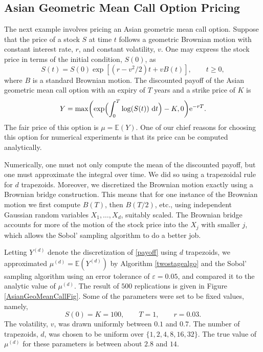 \documentclass[graybox]{svmult}
\newcommand{\me}{\ensuremath{\mathrm{e}}} %
\newcommand\e{\mathbb{E}}
\newcommand{\rd}{\,\mathrm{d}}
\newcommand{\dif}{\rd}
\begin{document}
\subsection{Asian Geometric Mean Call Option Pricing}

The next example involves pricing an Asian geometric mean call option.  Suppose that the price of a stock $S$ at time $t$ follows a geometric Brownian motion with constant interest rate, $r$, and constant volatility, $v$.  One may express the stock price in terms of the initial condition, $S(0)$, as 
\[
S(t)=S(0) \exp[(r-v^2/2)t + v B(t)], \qquad t \ge 0,
\]
where $B$ is a standard Brownian motion.  The discounted payoff of the Asian geometric mean call option with an expiry of $T$ years and a strike price of $K$ is 
\begin{equation} \label{payoff}
Y=\max\biggl(\exp\Bigl(\int_0^T \log(S(t)) \, \dif t \Bigr) - K,0 \biggr)\me^{-rT}.
\end{equation}
The fair price of this option is $\mu=\e(Y)$. One of our chief reasons for choosing this option for numerical experiments is that its price can be computed analytically.

Numerically, one must not only compute the mean of the discounted payoff, but one must approximate the integral over time.  We did so using a trapezoidal rule for $d$ trapezoids.  Moreover, we discretized the Brownian motion exactly using a Brownian bridge construction.  This means that for one instance of the Brownian motion we first compute $B(T)$, then $B(T/2)$, etc., using independent Gaussian random variables $X_1, \ldots, X_d$, suitably scaled. The Brownian bridge accounts for more of the motion of the stock price into the $X_j$ with smaller $j$, which allows the Sobol' sampling algorithm to do a better job.  

Letting $Y^{(d)}$ denote the discretization of \eqref{payoff} using $d$ trapezoids, we approximated $\mu^{(d)}=\e(Y^{(d)})$ by Algorithm \ref{twostagealgo} and the Sobol' sampling algorithm using an error tolerance of $\varepsilon=0.05$, and compared it to the analytic value of $\mu^{(d)}$.  The result of $500$ replications is given in Figure \ref{AsianGeoMeanCallFig}.  Some of the parameters were set to be fixed values, namely,
\[
S(0)=K=100, \qquad T=1, \qquad r=0.03.
\]
The volatility, $v$, was drawn uniformly between $0.1$ and $0.7$.  The number of trapezoids, $d$, was chosen to be uniform over $\{1, 2, 4, 8, 16, 32\}$.  The true value of $\mu^{(d)}$ for these parameters is between about $2.8$ and $14$.
\end{document}
